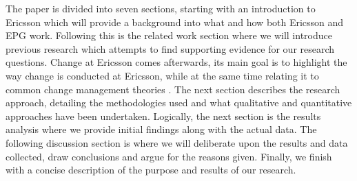\documentclass[fina_report_innit.tex]{subfiles}
\begin{document}
The paper is divided into seven sections, starting with an introduction to Ericsson which will provide a background into what and how both Ericsson and EPG work. Following this is the related work section where we will introduce previous research which attempts to find supporting evidence for our research questions. Change at Ericsson comes afterwards, its main goal is to highlight the way change is conducted at Ericsson, while at the same time relating it to common change management theories \cite{kotter1995leading} \cite{mintzberg1985strategies}. The next section describes the research approach, detailing the methodologies used and what qualitative and quantitative approaches have been undertaken. Logically, the next section is the results analysis where we provide initial findings along with the actual data. The following discussion section is where we will deliberate upon the results and data collected, draw conclusions and argue for the reasons given. Finally, we finish with a concise description of the purpose and results of our research.
\end{document}
